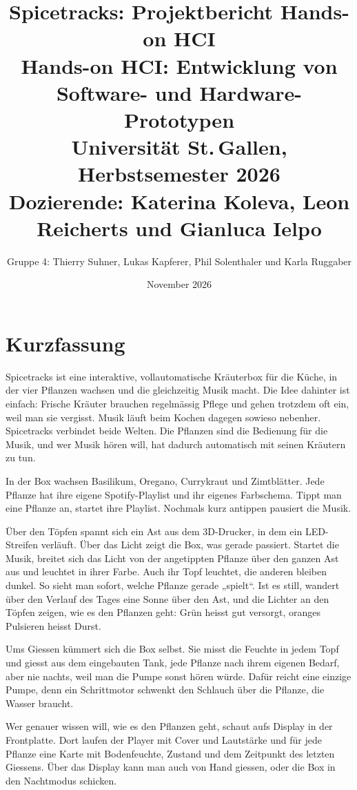 \documentclass[11pt,a4paper]{article}
\title{\textbf{Spicetracks: Projektbericht Hands-on HCI}\\[0.5em]
  \large Hands-on HCI: Entwicklung von Software- und Hardware-Prototypen\\
  Universität St.\,Gallen, Herbstsemester 2026\\
  Dozierende: Katerina Koleva, Leon Reicherts und Gianluca Ielpo}
\author{Gruppe 4: Thierry Suhner, Lukas Kapferer, Phil Solenthaler und Karla Ruggaber}
\date{November 2026}
\begin{document}
\maketitle
\tableofcontents
\newpage

\section{Kurzfassung}

Spicetracks ist eine interaktive, vollautomatische Kräuterbox für die Küche, in der vier Pflanzen wachsen und die gleichzeitig Musik macht. Die Idee dahinter ist einfach: Frische Kräuter brauchen regelmässig Pflege und gehen trotzdem oft ein, weil man sie vergisst. Musik läuft beim Kochen dagegen sowieso nebenher. Spicetracks verbindet beide Welten. Die Pflanzen sind die Bedienung für die Musik, und wer Musik hören will, hat dadurch automatisch mit seinen Kräutern zu tun. 

In der Box wachsen Basilikum, Oregano, Currykraut und Zimtblätter. Jede Pflanze hat ihre eigene Spotify-Playlist und ihr eigenes Farbschema. Tippt man eine Pflanze an, startet ihre Playlist. Nochmals kurz antippen pausiert die Musik.

Über den Töpfen spannt sich ein Ast aus dem 3D-Drucker, in dem ein LED-Streifen verläuft. Über das Licht zeigt die Box, was gerade passiert. Startet die Musik, breitet sich das Licht von der angetippten Pflanze über den ganzen Ast aus und leuchtet in ihrer Farbe. Auch ihr Topf leuchtet, die anderen bleiben dunkel. So sieht man sofort, welche Pflanze gerade „spielt“. Ist es still, wandert über den Verlauf des Tages eine Sonne über den Ast, und die Lichter an den Töpfen zeigen, wie es den Pflanzen geht: Grün heisst gut versorgt, oranges Pulsieren heisst Durst.

Ums Giessen kümmert sich die Box selbst. Sie misst die Feuchte in jedem Topf und giesst aus dem eingebauten Tank, jede Pflanze nach ihrem eigenen Bedarf, aber nie nachts, weil man die Pumpe sonst hören würde. Dafür reicht eine einzige Pumpe, denn ein Schrittmotor schwenkt den Schlauch über die Pflanze, die Wasser braucht.

Wer genauer wissen will, wie es den Pflanzen geht, schaut aufs Display in der Frontplatte. Dort laufen der Player mit Cover und Lautstärke und für jede Pflanze eine Karte mit Bodenfeuchte, Zustand und dem Zeitpunkt des letzten Giessens. Über das Display kann man auch von Hand giessen, oder die Box in den Nachtmodus schicken.
\end{document}
